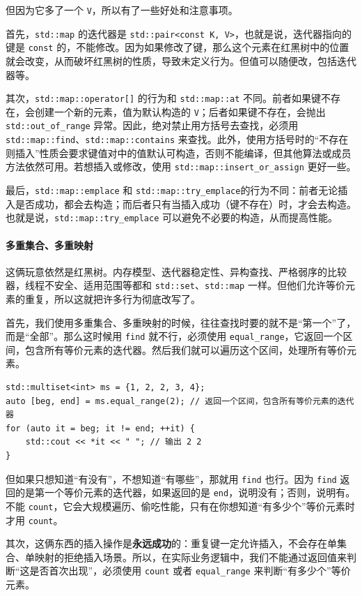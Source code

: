 但因为它多了一个 \verb|V|，所以有了一些好处和注意事项。

首先，\verb|std::map| 的迭代器是 \verb|std::pair<const K, V>|，也就是说，迭代器指向的键是 \verb|const| 的，不能修改。因为如果修改了键，那么这个元素在红黑树中的位置就会改变，从而破坏红黑树的性质，导致未定义行为。但值可以随便改，包括迭代器等。

其次，\verb|std::map::operator[]| 的行为和 \verb|std::map::at| 不同。前者如果键不存在，会创建一个新的元素，值为默认构造的 \verb|V|；后者如果键不存在，会抛出 \verb|std::out_of_range| 异常。因此，绝对禁止用方括号去查找，必须用 \verb|std::map::find|、\verb|std::map::contains| 来查找。此外，使用方括号时的“不存在则插入”性质会要求键值对中的值默认可构造，否则不能编译，但其他算法或成员方法依然可用。若想插入或修改，使用 \verb|std::map::insert_or_assign| 更好一些。

最后，\verb|std::map::emplace| 和 \verb|std::map::try_emplace|的行为不同：前者无论插入是否成功，都会去构造；而后者只有当插入成功（键不存在）时，才会去构造。也就是说，\verb|std::map::try_emplace| 可以避免不必要的构造，从而提高性能。

\paragraph{多重集合、多重映射} 这俩玩意依然是红黑树。内存模型、迭代器稳定性、异构查找、严格弱序的比较器，线程不安全、适用范围等都和 \verb|std::set|、\verb|std::map| 一样。但他们允许等价元素的重复，所以这就把许多行为彻底改写了。

首先，我们使用多重集合、多重映射的时候，往往查找时要的就不是“第一个”了，而是“全部”。那么这时候用 \verb|find| 就不行，必须使用 \verb|equal_range|，它返回一个区间，包含所有等价元素的迭代器。然后我们就可以遍历这个区间，处理所有等价元素。
\begin{verbatim}
std::multiset<int> ms = {1, 2, 2, 3, 4};
auto [beg, end] = ms.equal_range(2); // 返回一个区间，包含所有等价元素的迭代器
for (auto it = beg; it != end; ++it) {
    std::cout << *it << " "; // 输出 2 2
}
\end{verbatim}
但如果只想知道“有没有”，不想知道“有哪些”，那就用 \verb|find| 也行。因为 \verb|find| 返回的是第一个等价元素的迭代器，如果返回的是 \verb|end|，说明没有；否则，说明有。不能 \verb|count|，它会大规模遍历、偷吃性能，只有在你想知道“有多少个”等价元素时才用 \verb|count|。

其次，这俩东西的插入操作是\textbf{永远成功}的：重复键一定允许插入，不会存在单集合、单映射的拒绝插入场景。所以，在实际业务逻辑中，我们不能通过返回值来判断“这是否首次出现”，必须使用 \verb|count| 或者 \verb|equal_range| 来判断“有多少个”等价元素。

